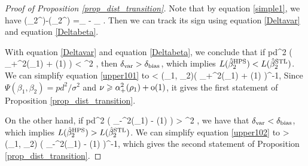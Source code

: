 \begin{proof}[Proof of Proposition \ref{prop_dist_transition}]
Note that by equation \eqref{simple1}, we have
 \be\label{var-beta}\te(\hat{\beta}_2^{\STL})-\te(\hat{\beta}_2^{\MTL}) =\delta_{\vari} - \delta_{\bias} .\ee
Then we can track its sign using equation \eqref{Deltavar} and equation \eqref{Deltabeta}.

\vspace{5pt}

 With equation \eqref{Deltavar} and equation \eqref{Deltabeta}, we conclude that if
\be\label{upper101}pd^2 \cdot {} \cdot \left( \al_+^2(\rho_1) +  \oo(1) \right) < \sigma^2  \cdot {},\ee
then $\delta_{\text{var}} > \delta_{\text{bias}}$, which implies $L(\hat{\beta}_2^{\textup{HPS}})<L(\hat{\beta}_2^{\textup{STL}})$. We can simplify equation \eqref{upper101} to
	\be\label{pos1}    <   \Phi(\rho_1, \rho_2)\cdot \left( \al_+^2(\rho_1) +  \oo(1) \right)^{-1}, \ee
Since $ \Psi(\beta_1,\beta_2)=pd^2/\sigma^2$ and $\nu\geqslant \alpha_+^2(\rho_1) +  \operatorname{o}(1) $, it gives the first statement of Proposition \ref{prop_dist_transition}.	

 \vspace{5pt}
	
 On the other hand, if
\be\label{upper102}pd^2 \cdot {} \cdot \left( \al_-^2(\rho_1) -  \oo(1) \right) > \sigma^2  \cdot {},\ee
	we have that $\delta_{\text{var}} < \delta_{\text{bias}}$, which implies $L(\hat{\beta}_2^{\textup{HPS}})>L(\hat{\beta}_2^{\textup{STL}})$. We can simplify equation \eqref{upper102} to
	\be\label{neg1}   >  \Phi(\rho_1, \rho_2) \cdot \left( \al_-^2(\rho_1) -  \oo(1) \right)^{-1}, \ee
which gives the second statement of Proposition \ref{prop_dist_transition}.
\end{proof}







